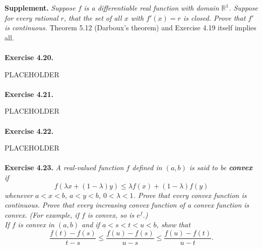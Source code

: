 \documentclass{article}
\begin{document}
\textbf{Supplement.}
\emph{Suppose $f$ is a differentiable real function with domain $\mathbb{R}^1$.
Suppose for every rational $r$,
that the set of all $x$ with $f'(x)=r$ is closed.
Prove that $f'$ is continuous.}
Theorem 5.12 (Darboux's theorem) and Exercise 4.19 itself implies all.
\\\\






\textbf{Exercise 4.20.}



PLACEHOLDER \\\\






\textbf{Exercise 4.21.}



PLACEHOLDER \\\\






\textbf{Exercise 4.22.}



PLACEHOLDER \\\\






\textbf{Exercise 4.23.}
\emph{A real-valued function $f$ defined in $(a,b)$
is said to be \textbf{convex} if
$$f(\lambda x + (1 - \lambda) y) \leq \lambda f(x) + (1 - \lambda) f(y)$$
whenever $a < x < b$, $a < y < b$, $0 < \lambda < 1$.
Prove that every convex function is continuous.
Prove that every increasing convex function of a convex function is convex.
(For example, if $f$ is convex, so is $e^f$.)} \\

\emph{If $f$ is convex in $(a,b)$ and if $a < s < t < u < b$,
show that
$$\frac{f(t)-f(s)}{t-s}
\leq \frac{f(u)-f(s)}{u-s}
\leq \frac{f(u)-f(t)}{u-t}.$$} \\
\end{document}
